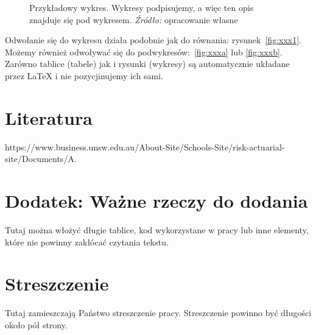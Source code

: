 \documentclass[polish, twoside, 12pt, a4paper]{article}
\theoremstyle{definition}
\theoremstyle{plain}
\theoremstyle{remark}
\begin{document}
\begin{figure}[hbt]
  \captionsetup{margin=10pt,font=small,labelfont=bf,width=.8\textwidth}

  \caption[Krótka nazwa II]{Przykładowy wykres. Wykresy podpisujemy, a więc ten opis znajduje się pod wykresem. \textit{Źródło:} opracowanie własne}\label{fig:xxx}
\end{figure}



Odwołanie się do wykresu działa podobnie jak do równania: rysunek~\ref{fig:xxx1}. Możemy również odwoływać się do podwykresów:~\ref{fig:xxxa} lub \ref{fig:xxxb}. Zarówno tablice (tabele) jak i rysunki (wykresy) są automatycznie układane przez \LaTeX{} i nie pozycjinujemy ich sami.

\clearpage
\section{Literatura}

https://www.business.unsw.edu.au/About-Site/Schools-Site/risk-actuarial-site/Documents/A.%




\appendix

\clearpage
\section{Dodatek: Ważne rzeczy do dodania}

Tutaj można włożyć długie tablice, kod wykorzystane w pracy lub inne elementy, które nie powinny zakłócać czytania tekstu.


\clearpage



\clearpage
{}
\listoftables

\clearpage
{}
\listoffigures



\clearpage
{}
\section*{Streszczenie}

Tutaj zamieszczają Państwo streszczenie pracy. Streszczenie powinno być długości około pół strony.
\end{document}

